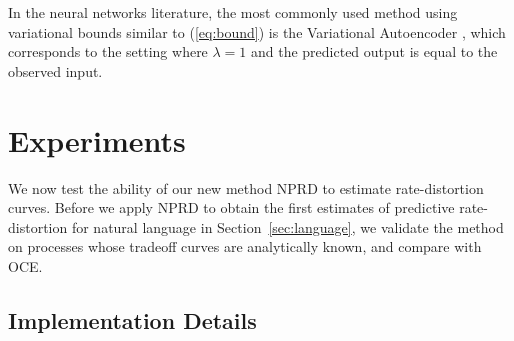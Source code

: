 \documentclass[entropy,article,submit,moreauthors,pdftex,10pt,a4paper]{Definitions/mdpi}
\begin{document}
In the neural networks literature, the most commonly used method using variational bounds similar to (\ref{eq:bound}) is the Variational Autoencoder \citep{kingma-auto-encoding-2014}, which corresponds to the setting where $\lambda=1$ and the predicted output is equal to the observed input.






\section{Experiments}\label{sec:experiments}
We now test the ability of our new method NPRD to estimate rate-distortion curves.
Before we apply NPRD to obtain the first estimates of predictive rate-distortion for natural language in Section~\ref{sec:language}, we validate the method on processes whose tradeoff curves are analytically known, and compare with OCE.

\subsection{Implementation Details}
\end{document}
